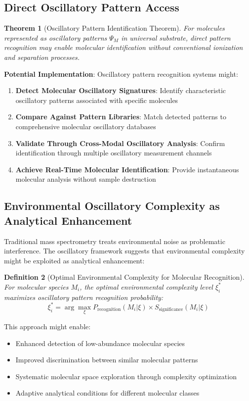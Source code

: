 \documentclass[11pt,a4paper]{article}
\newtheorem{theorem}{Theorem}[section]
\newtheorem{definition}[theorem]{Definition}
\theoremstyle{remark}
\begin{document}
\subsection{Direct Oscillatory Pattern Access}

\begin{theorem}[Oscillatory Pattern Identification Theorem]
For molecules represented as oscillatory patterns $\Psi_M$ in universal substrate, direct pattern recognition may enable molecular identification without conventional ionization and separation processes.
\end{theorem}

\textbf{Potential Implementation}: Oscillatory pattern recognition systems might:

\begin{enumerate}
\item \textbf{Detect Molecular Oscillatory Signatures}: Identify characteristic oscillatory patterns associated with specific molecules
\item \textbf{Compare Against Pattern Libraries}: Match detected patterns to comprehensive molecular oscillatory databases
\item \textbf{Validate Through Cross-Modal Oscillatory Analysis}: Confirm identification through multiple oscillatory measurement channels
\item \textbf{Achieve Real-Time Molecular Identification}: Provide instantaneous molecular analysis without sample destruction
\end{enumerate}

\subsection{Environmental Oscillatory Complexity as Analytical Enhancement}

Traditional mass spectrometry treats environmental noise as problematic interference. The oscillatory framework suggests that environmental complexity might be exploited as analytical enhancement:

\begin{definition}[Optimal Environmental Complexity for Molecular Recognition]
For molecular species $M_i$, the optimal environmental complexity level $\xi_i^*$ maximizes oscillatory pattern recognition probability:
$$\xi_i^* = \arg\max_\xi P_{\text{recognition}}(M_i | \xi) \times S_{\text{significance}}(M_i | \xi)$$
\end{definition}

This approach might enable:
\begin{itemize}
\item Enhanced detection of low-abundance molecular species
\item Improved discrimination between similar molecular patterns
\item Systematic molecular space exploration through complexity optimization
\item Adaptive analytical conditions for different molecular classes
\end{itemize}
\end{document}
